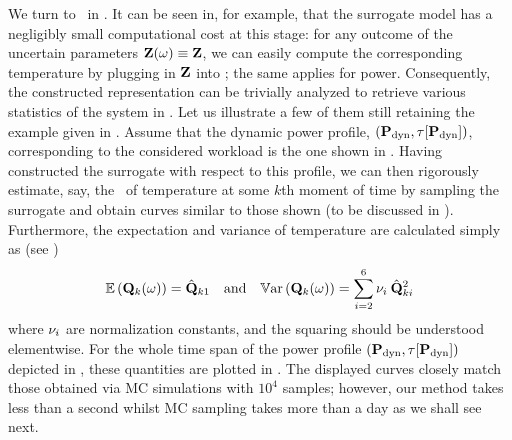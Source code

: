 We turn to \ in .
It can be seen in, for example,  that the surrogate model has a negligibly small computational cost at this stage: for any outcome of the uncertain parameters $\mathbf{Z}(\omega) \equiv \mathbf{Z}$, we can easily compute the corresponding temperature by plugging in $\mathbf{Z}$ into ; the same applies for power.
Consequently, the constructed representation can be trivially analyzed to retrieve various statistics of the system in .
Let us illustrate a few of them still retaining the example given in .
Assume that the dynamic power profile, $\profilePdyn$, corresponding to the considered workload is the one shown in .
Having constructed the surrogate with respect to this profile, we can then rigorously estimate, say, the \pdf\ of temperature at some $k$th moment of time by sampling the surrogate and obtain curves similar to those shown  (to be discussed in ).
Furthermore, the expectation and variance of temperature are calculated simply as (see )
\[
  \mathbb{E}\left(\mathbf{Q}_k(\omega)\right) = \hat{\mathbf{Q}}_{k1} \hspace{1em} \text{and} \hspace{1em} \mathbb{V}\text{ar}\left(\mathbf{Q}_k(\omega)\right) = \sum_{i = 2}^{6} \nu_i \: \hat{\mathbf{Q}}_{ki}^2
\]
where $\nu_i$ are normalization constants, and the squaring should be understood elementwise.
For the whole time span of the power profile $\profilePdyn$ depicted in , these quantities are plotted in .
The displayed curves closely match those obtained via MC simulations with $10^4$ samples; however, our method takes less than a second whilst MC sampling takes more than a day as we shall see next.


